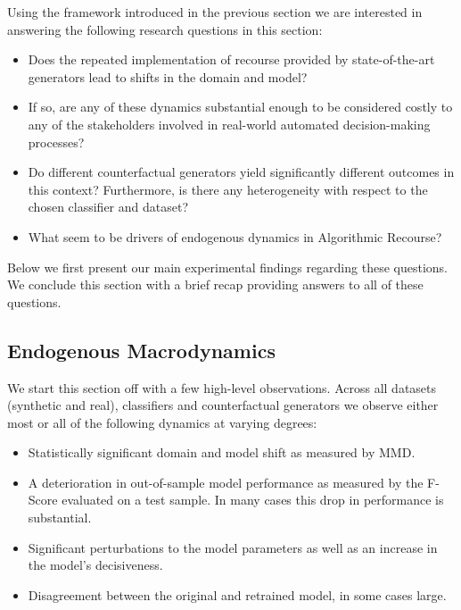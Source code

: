 \documentclass[conference,final,]{IEEEtran}
\providecommand{\tightlist}{%
  \setlength{\itemsep}{0pt}\setlength{\parskip}{0pt}}
\theoremstyle{definition}
\theoremstyle{definition}
\theoremstyle{definition}
\theoremstyle{definition}
\theoremstyle{remark}
\begin{document}
Using the framework introduced in the previous section we are interested in answering the following research questions in this section:

\begin{itemize}
\tightlist
\item
  Does the repeated implementation of recourse provided by state-of-the-art generators lead to shifts in the domain and model?
\item
  If so, are any of these dynamics substantial enough to be considered costly to any of the stakeholders involved in real-world automated decision-making processes?
\item
  Do different counterfactual generators yield significantly different outcomes in this context? Furthermore, is there any heterogeneity with respect to the chosen classifier and dataset?
\item
  What seem to be drivers of endogenous dynamics in Algorithmic Recourse?
\end{itemize}

Below we first present our main experimental findings regarding these questions. We conclude this section with a brief recap providing answers to all of these questions.

\hypertarget{endogenous-macrodynamics}{%
\subsection{Endogenous Macrodynamics}\label{endogenous-macrodynamics}}

We start this section off with a few high-level observations. Across all datasets (synthetic and real), classifiers and counterfactual generators we observe either most or all of the following dynamics at varying degrees:

\begin{itemize}
\tightlist
\item
  Statistically significant domain and model shift as measured by MMD.
\item
  A deterioration in out-of-sample model performance as measured by the F-Score evaluated on a test sample. In many cases this drop in performance is substantial.
\item
  Significant perturbations to the model parameters as well as an increase in the model's decisiveness.
\item
  Disagreement between the original and retrained model, in some cases large.
\end{itemize}
\end{document}
